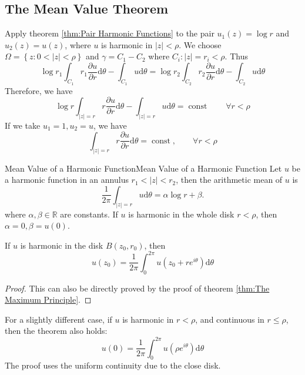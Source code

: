 \documentclass[../main.tex]{subfiles}
\begin{document}
\subsection{The Mean Value Theorem}
Apply theorem \ref{thm:Pair Harmonic Functions} to the pair $u_1(z)=\log r$ and $u_2(z) = u(z)$, where $u$ is harmonic in $\left|z\right|<\rho$. We choose $\Omega=\left\{ z: 0<\left|z\right|<\rho \right\}$ and $\gamma=C_1-C_2$ where $C_i: \left|z\right| = r_i<\rho$. Thus
\begin{equation*}
	\log r_1 \int_{C_1} r_1 \frac{\partial u}{\partial r} \mathrm{d} \theta - \int_{C_1} u \mathrm{d} \theta = \log r_2 \int_{C_2} r_2 \frac{\partial u}{\partial r} \mathrm{d} \theta - \int_{C_2} u \mathrm{d} \theta
\end{equation*}
Therefore, we have
\begin{equation}
	\log r \int_{\left|z\right|=r} r \frac{\partial u}{\partial r} \mathrm{d} \theta - \int_{\left|z\right|=r} u \mathrm{d} \theta = \operatorname{const} \qquad \forall r<\rho
\end{equation}
If we take $u_1=1,u_2=u$, we have
\begin{equation}
	\int_{\left|z\right|=r} r \frac{\partial u}{\partial r} \mathrm{d} \theta = \operatorname{const}, \qquad \forall r<\rho
\end{equation}

\begin{theorem}{Mean Value of a Harmonic Function}{Mean Value of a Harmonic Function}
	Let $u$ be a harmonic function in an annulus $r_1<\left|z\right|<r_2$, then the arithmetic mean of $u$ is
	\begin{equation}
		\frac{1}{2 \pi} \int_{\left|z\right|=r} u \mathrm{d} \theta = \alpha \log r + \beta.
	\end{equation}
	where $\alpha,\beta\in \mathbb{R}$ are constants. If $u$ is harmonic in the whole disk $r<\rho$, then $\alpha=0, \beta=u(0)$.

	If $u$ is harmonic in the disk $B(z_0,r_0)$, then
	\begin{equation}
		u(z_0) = \frac{1}{2 \pi } \int_0^{2 \pi} u(z_0 + re^{i \theta}) \mathrm{d} \theta
	\end{equation}
\end{theorem}
\begin{proof}
	This can also be directly proved by the proof of theorem \ref{thm:The Maximum Principle}.
\end{proof}

\begin{remark}
	For a slightly different case, if $u$ is harmonic in $r< \rho$, and continuous in $r \leq \rho$, then the theorem also holds:
	\begin{equation*}
		u(0) = \frac{1}{2 \pi} \int_0^{2 \pi} u(\rho e^{i \theta}) \mathrm{d} \theta
	\end{equation*}
	The proof uses the uniform continuity due to the close disk.
\end{remark}
\end{document}
